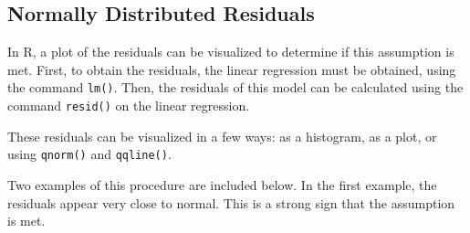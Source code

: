 \documentclass{report}\usepackage[]{graphicx}\usepackage[]{color}
\begin{document}
\subsection{Normally Distributed Residuals}
In \textsf{R}, a plot of the residuals can be visualized to determine if this assumption is met.  First, to obtain the residuals, the linear regression must be obtained, using the command \texttt{lm()}.  Then, the residuals of this model can be calculated using the command \texttt{resid()} on the linear regression.  


These residuals can be visualized in a few ways: as a histogram, as a plot, or using \texttt{qnorm()} and \texttt{qqline()}.


Two examples of this procedure are included below.  In the first example, the residuals appear very close to normal.  This is a strong sign that the assumption is met.  
\end{document}
